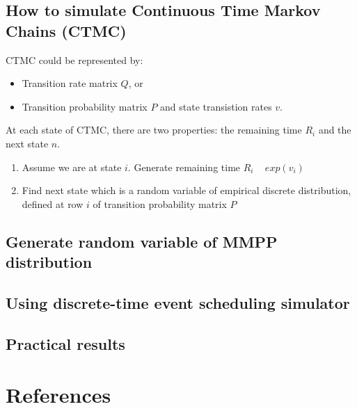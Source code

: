 \documentclass[a4paper]{article}
\begin{document}
\subsection{How to simulate Continuous Time Markov Chains (CTMC)}
CTMC could be represented by:
\begin{itemize}
	\item Transition rate matrix $Q$, or
	\item Transition probability matrix $P$ and state transistion rates $v$. 
\end{itemize}
At each state of CTMC, there are two properties: the remaining time $R_i$ and the next state $n$.
\begin{enumerate}
	\item Assume we are at state $i$. Generate remaining time $R_i$ ~ $exp(v_i)$
	\item Find next state which is a random variable of empirical discrete distribution, defined at row $i$ of transition probability matrix $P$
\end{enumerate}

\subsection{Generate random variable of MMPP distribution}
\subsection{Using discrete-time event scheduling simulator}
\subsection{Practical results}
\section{References}
\end{document}
